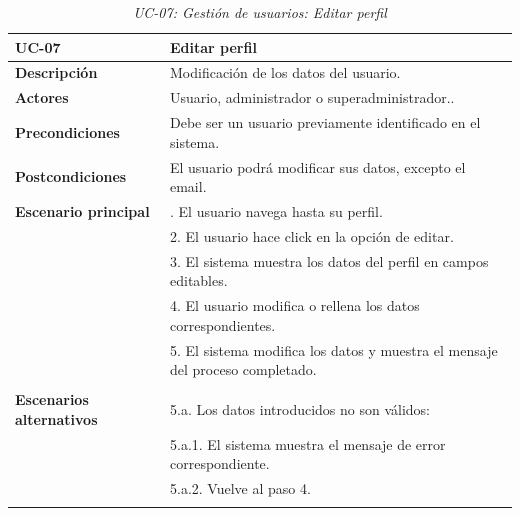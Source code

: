 \begin{table}
  \begin{center}
    \begin{tabularx}{16.4cm}{|l|X|}
      \hline
      \textbf{UC-07} & \textbf{Editar perfil}\\
      \hline
      \textbf{Descripción} & Modificación de los datos del usuario.\\
      \hline
      \textbf{Actores} & Usuario, administrador o superadministrador..\\
      \hline
      \textbf{Precondiciones} & Debe ser un usuario previamente identificado en el sistema.\\
      \hline
      \textbf{Postcondiciones} & El usuario podrá modificar sus datos, excepto el email.\\
      \hline
      \textbf{Escenario principal} & \smallskip 1. El usuario navega hasta su perfil.\\
      & 2. El usuario hace click en la opción de editar. \\
      & 3. El sistema muestra los datos del perfil en campos editables.\\
      & 4. El usuario modifica o rellena los datos correspondientes.\\
      & 5. El sistema modifica los datos y muestra el mensaje del proceso completado.\\ 
      & \\
      \hline
      \textbf{Escenarios alternativos} & \smallskip 5.a. Los datos introducidos no son válidos:\\
      & \hspace{0.3cm} 5.a.1. El sistema muestra el mensaje de error correspondiente.\\
      & \hspace{0.3cm} 5.a.2. Vuelve al paso 4.\\
      & \\
      \hline
    \end{tabularx}
    \caption{\textit{UC-07: Gestión de usuarios: Editar perfil}}
    \label{tab:CU-editar-perfil}
  \end{center}
\end{table}


